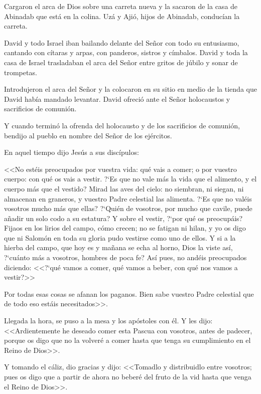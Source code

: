 Cargaron el arca de Dios sobre una carreta 
nueva y la sacaron de la casa de Abinadab que está en la colina. 
Uzá y Ajió, hijos de 
Abinadab, conducían la carreta. 

David y todo 
Israel iban bailando delante del Señor con todo 
su entusiasmo, cantando con cítaras y arpas, 
con panderos, sistros y címbalos. David y toda 
la casa de Israel trasladaban el arca del Señor 
entre gritos de júbilo y sonar de trompetas. 

Introdujeron el arca del Señor y la colocaron 
en su sitio en medio de la tienda que David 
había mandado levantar. David ofreció ante el 
Señor holocaustos y sacrificios de comunión. 

Y 
cuando terminó la ofrenda del holocausto y de 
los sacrificios de comunión, bendijo al pueblo 
en nombre del Señor de los ejércitos. 


 En aquel tiempo dijo Jesús a sus discípulos: 
 
<<No estéis preocupados por vuestra vida: qué 
vais a comer; o por vuestro cuerpo: con qué os 
vais a vestir. ?`Es que no vale más la vida que 
el alimento, y el cuerpo más que el vestido? 
Mirad las aves del cielo: no siembran, ni 
siegan, ni almacenan en graneros, y vuestro 
Padre celestial las alimenta. ?`Es que no valéis 
vosotros mucho más que ellas? ?`Quién de 
vosotros, por mucho que cavile, puede añadir 
un solo codo a su estatura? Y sobre el vestir, 
?`por qué os preocupáis? Fijaos en los lirios del 
campo, cómo crecen; no se fatigan ni hilan, y 
yo os digo que ni Salomón en toda su gloria 
pudo vestirse como uno de ellos. Y si a la 
hierba del campo, que hoy es y mañana se 
echa al horno, Dios la viste así, ?`cuánto más a 
vosotros, hombres de poca fe? 
Así pues, no 
andéis preocupados diciendo: <<?`qué vamos a 
comer, qué vamos a beber, con qué nos vamos 
a vestir?>> 

Por todas esas cosas se afanan los 
paganos. Bien sabe vuestro Padre celestial que 
de todo eso estáis necesitados>>. 


 Llegada la hora, se puso a la mesa y los 
apóstoles con él. Y les dijo: <<Ardientemente he 
deseado comer esta Pascua con vosotros, antes 
de padecer, porque os digo que no la volveré a 
comer hasta que tenga su cumplimiento en el 
Reino de Dios>>. 

Y tomando el cáliz, dio gracias y dijo: <<Tomadlo y distribuidlo entre vosotros; 
pues os digo que a partir de ahora no beberé 
del fruto de la vid hasta que venga el Reino de 
Dios>>. 

